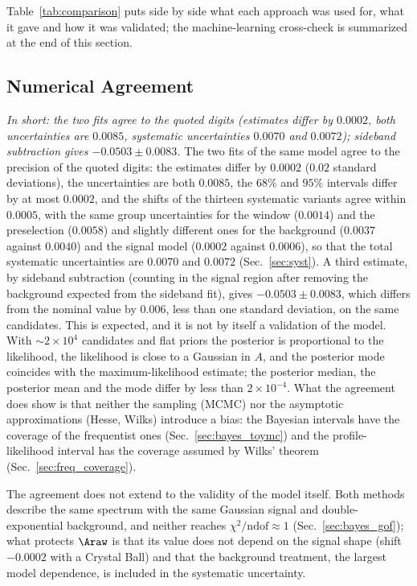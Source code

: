 Table~\ref{tab:comparison} puts side by side what each approach was used for, what it gave and how it was validated; the machine-learning cross-check is summarized at the end of this section.



\subsection{Numerical Agreement}
\label{sec:comparison_numbers}
\emph{In short: the two fits agree to the quoted digits (estimates differ by $0.0002$, both uncertainties are $0.0085$, systematic uncertainties $0.0070$ and $0.0072$); sideband subtraction gives $-0.0503\pm0.0083$.}
The two fits of the same model agree to the precision of the quoted digits: the estimates differ by $0.0002$ ($0.02$ standard deviations), the uncertainties are both $0.0085$, the $68\%$ and $95\%$ intervals differ by at most $0.0002$, and the shifts of the thirteen systematic variants agree within $0.0005$, with the same group uncertainties for the window ($0.0014$) and the preselection ($0.0058$) and slightly different ones for the background ($0.0037$ against $0.0040$) and the signal model ($0.0002$ against $0.0006$), so that the total systematic uncertainties are $0.0070$ and $0.0072$ (Sec.~\ref{sec:syst}). A third estimate, by sideband subtraction (counting in the signal region after removing the background expected from the sideband fit), gives $-0.0503\pm0.0083$, which differs from the nominal value by $0.006$, less than one standard deviation, on the same candidates. This is expected, and it is not by itself a validation of the model. With $\sim2\times10^4$ candidates and flat priors the posterior is proportional to the likelihood, the likelihood is close to a Gaussian in $A$, and the posterior mode coincides with the maximum-likelihood estimate; the posterior median, the posterior mean and the mode differ by less than $2\times10^{-4}$. What the agreement does show is that neither the sampling (MCMC) nor the asymptotic approximations (Hesse, Wilks) introduce a bias: the Bayesian intervals have the coverage of the frequentist ones (Sec.~\ref{sec:bayes_toymc}) and the profile-likelihood interval has the coverage assumed by Wilks' theorem (Sec.~\ref{sec:freq_coverage}).

The agreement does not extend to the validity of the model itself. Both methods describe the same spectrum with the same Gaussian signal and double-exponential background, and neither reaches $\chi^2/\mathrm{ndof}\approx1$ (Sec.~\ref{sec:bayes_gof}); what protects $\Araw$ is that its value does not depend on the signal shape (shift $-0.0002$ with a Crystal Ball) and that the background treatment, the largest model dependence, is included in the systematic uncertainty.

